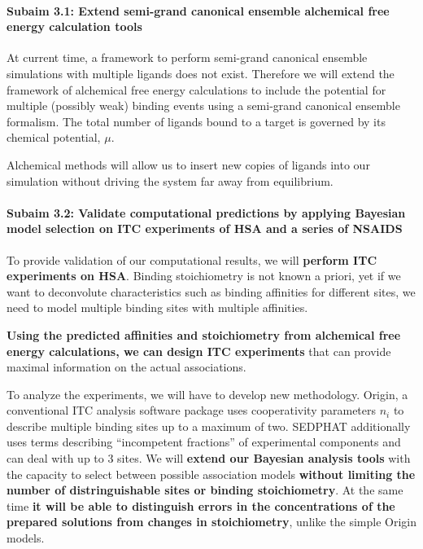 \documentclass[10pt,final]{article}
\newcommand{\subsubsubsection}[1]{\paragraph*{#1}}
\begin{document}
\subsubsubsection{Subaim 3.1: Extend semi-grand canonical ensemble alchemical free energy calculation tools}
At current time, a framework to perform semi-grand canonical ensemble simulations with multiple ligands does not exist. Therefore we will extend the framework of alchemical free energy calculations to include the potential for multiple (possibly weak) binding events using a semi-grand canonical ensemble formalism. 
The total number of ligands bound to a target is governed by its chemical potential, $\mu$. 

Alchemical methods will allow us to insert new copies of ligands into our simulation without driving the system far away from equilibrium. 


\subsubsubsection{Subaim 3.2: Validate computational predictions by applying Bayesian model selection on ITC  experiments of HSA and a series of NSAIDS}
To provide validation of our computational results, we will \textbf{perform ITC experiments on HSA}. Binding stoichiometry is not known a priori, yet if we want to deconvolute characteristics such as binding affinities for different sites, we need to model multiple binding sites with multiple affinities.

\textbf{Using the predicted affinities and stoichiometry from alchemical free energy calculations, we can design ITC experiments} that can provide maximal information on the actual associations. 

To analyze the experiments, we will have to develop new methodology. 
Origin, a conventional ITC analysis software package uses cooperativity parameters $n_i$ to describe multiple binding sites\cite{MicroCal2004a} up to a maximum of two. SEDPHAT additionally uses terms describing ``incompetent fractions'' of experimental components \cite{Houtman2007a,Zhao2015b} and can deal with up to 3 sites.
We will \textbf{extend our Bayesian analysis tools} with the capacity to select between possible association models \textbf{without limiting the number of distringuishable sites or binding stoichiometry}. At the same time \textbf{it will be able to distinguish errors in the concentrations of the prepared solutions from changes in stoichiometry}, unlike the simple Origin models. 
\end{document}
